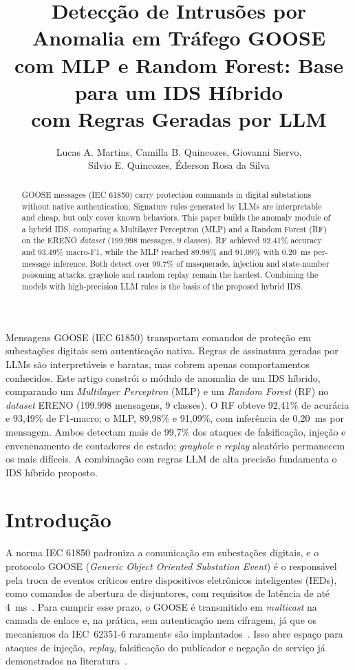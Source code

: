 \documentclass[12pt]{article}
\title{Detecção de Intrusões por Anomalia em Tráfego GOOSE\\
com MLP e Random Forest: Base para um IDS Híbrido\\ com Regras Geradas por LLM}
\author{
Lucas A. Martins\inst{1},
Camilla B. Quincozes\inst{1}, Giovanni Siervo\inst{1},\\
Silvio E. Quincozes\inst{1,2}, Éderson Rosa da Silva\inst{1}
}
\begin{document}
\maketitle

\begin{abstract}
GOOSE messages (IEC 61850) carry protection commands in digital substations
without native authentication. Signature rules generated by LLMs are
interpretable and cheap, but only cover known behaviors. This paper builds the
anomaly module of a hybrid IDS, comparing a Multilayer Perceptron (MLP) and a
Random Forest (RF) on the ERENO \textit{dataset} (199,998 messages, 9 classes). RF
achieved 92.41\% accuracy and 93.49\% macro-F1, while the MLP reached 89.98\%
and 91.09\% with 0.20~ms per-message inference. Both detect over 99.7\% of
masquerade, injection and state-number poisoning attacks; grayhole and random
replay remain the hardest. Combining the models with high-precision LLM rules
is the basis of the proposed hybrid IDS.
\end{abstract}

\begin{resumo}
Mensagens GOOSE (IEC 61850) transportam comandos de proteção em subestações
digitais sem autenticação nativa. Regras de assinatura geradas por LLMs são
interpretáveis e baratas, mas cobrem apenas comportamentos conhecidos. Este
artigo constrói o módulo de anomalia de um IDS híbrido, comparando um
\textit{Multilayer Perceptron} (MLP) e um \textit{Random Forest} (RF) no
\textit{dataset} ERENO (199.998 mensagens, 9 classes). O RF obteve 92,41\% de acurácia
e 93,49\% de F1-macro; o MLP, 89,98\% e 91,09\%, com inferência de 0,20~ms por
mensagem. Ambos detectam mais de 99,7\% dos ataques de falsificação, injeção e
envenenamento de contadores de estado; \textit{grayhole} e \textit{replay}
aleatório permanecem os mais difíceis. A combinação com regras LLM de alta
precisão fundamenta o IDS híbrido proposto.
\end{resumo}

\section{Introdução}

A norma IEC 61850 padroniza a comunicação em subestações digitais, e o
protocolo GOOSE (\textit{Generic Object Oriented Substation Event}) é o
responsável pela troca de eventos críticos entre dispositivos eletrônicos
inteligentes (IEDs), como comandos de abertura de disjuntores, com requisitos
de latência de até 4~ms~\cite{iec61850-8-1}. Para cumprir esse prazo, o GOOSE é
transmitido em \textit{multicast} na camada de enlace e, na prática, sem
autenticação nem cifragem, já que os mecanismos da IEC~62351-6 raramente são
implantados~\cite{iec62351-6,quincozes2021survey}. Isso abre espaço para
ataques de injeção, \textit{replay}, falsificação do publicador e negação de
serviço já demonstrados na
literatura~\cite{hoyos2012exploiting,kush2014poisoned,boeding2023testbed}.
\end{document}

